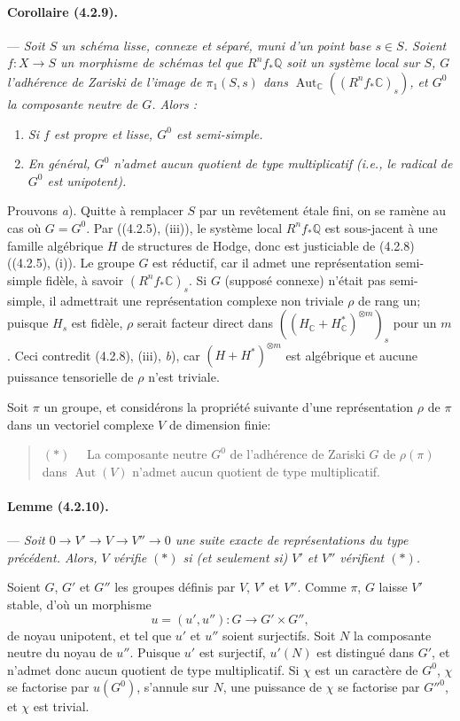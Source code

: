 \documentclass[10pt]{article}
\newcommand{\C}{\mathbb C}
\newcommand{\Q}{\mathbb Q}
\providecommand{\Aut}{\operatorname{Aut}}
\begin{document}
\paragraph{Corollaire (4.2.9).} --- {\itshape Soit $S$ un schéma lisse, connexe et séparé, muni d'un point base $s\in S$. Soient $f:X\to S$ un morphisme de schémas tel que $R^nf_*\Q$ soit un système local sur $S$, $G$ l'adhérence de Zariski de l'image de $\pi_1(S,s)$ dans $\Aut_\C((R^nf_*\C)_s)$, et $G^0$ la composante neutre de $G$. Alors :}
\begin{enumerate}[label=\alph*)]
\item {\itshape Si $f$ est propre et lisse, $G^0$ est semi-simple.}
\item {\itshape En général, $G^0$ n'admet aucun quotient de type multiplicatif (i.e., le radical de $G^0$ est unipotent).}
\end{enumerate}

Prouvons \textit{a}). Quitte à remplacer $S$ par un revêtement étale fini, on se ramène au cas où $G=G^0$. Par ((4.2.5), (iii)), le système local $R^nf_*\Q$ est sous-jacent à une famille algébrique $H$ de structures de Hodge, donc est justiciable de (4.2.8) ((4.2.5), (i)). Le groupe $G$ est réductif, car il admet une représentation semi-simple fidèle, à savoir $(R^nf_*\C)_s$. Si $G$ (supposé connexe) n'était pas semi-simple, il admettrait une représentation complexe non triviale $\rho$ de rang un; puisque $H_s$ est fidèle, $\rho$ serait facteur direct dans $((H_\C+H_\C^*)^{\otimes m})_s$ pour un $m$. Ceci contredit (4.2.8), (iii), \textit{b}), car $(H+H^*)^{\otimes m}$ est algébrique et aucune puissance tensorielle de $\rho$ n'est triviale.

Soit $\pi$ un groupe, et considérons la propriété suivante d'une représentation $\rho$ de $\pi$ dans un vectoriel complexe $V$ de dimension finie:
\begin{quote}
\noindent $(*)\quad$ La composante neutre $G^0$ de l'adhérence de Zariski $G$ de $\rho(\pi)$ dans $\Aut(V)$ n'admet aucun quotient de type multiplicatif.
\end{quote}

\paragraph{Lemme (4.2.10).} --- {\itshape Soit $0\to V'\to V\to V''\to0$ une suite exacte de représentations du type précédent. Alors, $V$ vérifie $(*)$ si (et seulement si) $V'$ et $V''$ vérifient $(*)$.}

Soient $G$, $G'$ et $G''$ les groupes définis par $V$, $V'$ et $V''$. Comme $\pi$, $G$ laisse $V'$ stable, d'où un morphisme
\[
u=(u',u''):G\longrightarrow G'\times G'',
\]
de noyau unipotent, et tel que $u'$ et $u''$ soient surjectifs. Soit $N$ la composante neutre du noyau de $u''$. Puisque $u'$ est surjectif, $u'(N)$ est distingué dans $G'$, et n'admet donc aucun
quotient de type multiplicatif. Si $\chi$ est un caractère de $G^0$, $\chi$ se factorise par $u(G^0)$, s'annule sur $N$, une puissance de $\chi$ se factorise par $G''^0$, et $\chi$ est trivial.
\end{document}
